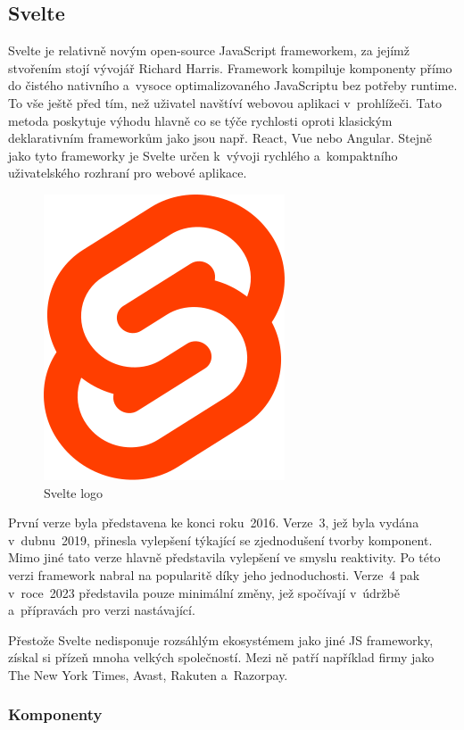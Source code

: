 \subsection{Svelte}

Svelte je relativně novým open-source JavaScript frameworkem, za jejímž stvořením stojí vývojář Richard Harris. 
Framework kompiluje komponenty přímo do čistého nativního a~vysoce optimalizovaného JavaScriptu bez potřeby runtime. 
To vše ještě před tím, než uživatel navštíví webovou aplikaci v~prohlížeči. 
Tato metoda poskytuje výhodu hlavně co se týče rychlosti oproti klasickým deklarativním frameworkům jako jsou např. React, Vue nebo Angular. 
Stejně jako tyto frameworky je Svelte určen k~vývoji rychlého a~kompaktního uživatelského rozhraní pro webové aplikace.

\begin{figure}[htb]
	\centering
		\includegraphics[width=.3\textwidth]{images/svelte-logo.png}
	\caption[Svelte logo]{Svelte logo \cite{svelte}}
	\label{fig:sveltelogo}
\end{figure}

První verze byla představena ke konci roku~2016. Verze~3, jež byla vydána v~dubnu~2019, přinesla vylepšení týkající se zjednodušení tvorby komponent. 
Mimo jiné tato verze hlavně představila vylepšení ve smyslu reaktivity. Po této verzi framework nabral na popularitě díky jeho jednoduchosti.
Verze~4 pak v~roce~2023 představila pouze minimální změny, jež spočívají v~údržbě a~přípravách pro verzi nastávající.

Přestože Svelte nedisponuje rozsáhlým ekosystémem jako jiné JS frameworky, získal si přízeň mnoha velkých společností. 
Mezi ně patří například firmy jako The New York Times, Avast, Rakuten a~Razorpay.\cite{sveltemdn,svelte,sveltedevinterface}

\subsubsection{Komponenty}

